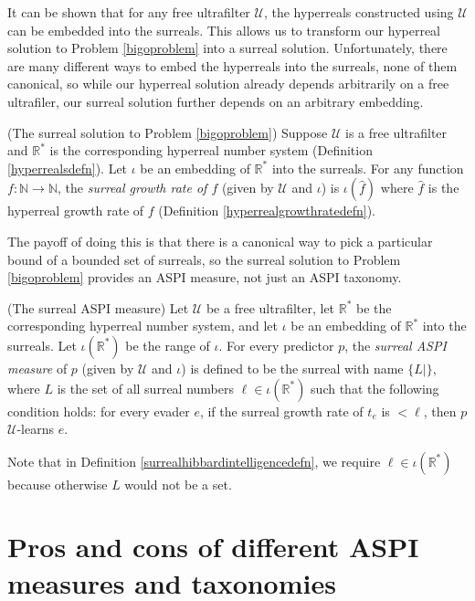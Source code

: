 \documentclass[twoside,11pt]{article}
\begin{document}
It can be shown that for any free ultrafilter $\mathcal U$, the hyperreals constructed using
$\mathcal U$ can be embedded into the surreals. This allows us to transform our hyperreal
solution to Problem \ref{bigoproblem} into a surreal solution.
Unfortunately, there are many different ways to embed the hyperreals into the surreals,
none of them canonical, so while our hyperreal solution already depends arbitrarily on
a free ultrafiler, our surreal solution further depends on an arbitrary embedding.

\begin{definition}
    (The surreal solution to Problem \ref{bigoproblem})
    Suppose $\mathcal U$ is a free ultrafilter and $\mathbb R^*$ is the corresponding
    hyperreal number system (Definition \ref{hyperrealsdefn}).
    Let $\iota$ be an embedding of $\mathbb R^*$ into the surreals.
    For any function $f:\mathbb N\to\mathbb N$, the \emph{surreal growth rate
    of $f$} (given by $\mathcal U$ and $\iota$) is
    $\iota(\hat f)$ where $\hat f$ is the hyperreal growth
    rate of $f$ (Definition \ref{hyperrealgrowthratedefn}).
\end{definition}

The payoff of doing this is that there is a canonical way to pick a particular
bound of a bounded set of surreals, so the surreal solution to Problem \ref{bigoproblem}
provides an ASPI measure, not just an ASPI taxonomy.

\begin{definition}
\label{surrealhibbardintelligencedefn}
    (The surreal ASPI measure)
    Let $\mathcal U$ be a free ultrafilter, let $\mathbb R^*$ be the corresponding
    hyperreal number system, and let $\iota$ be an embedding of $\mathbb R^*$
    into the surreals. Let $\iota(\mathbb R^*)$ be the range of $\iota$.
    For every predictor $p$, the \emph{surreal ASPI measure} of $p$
    (given by $\mathcal U$ and $\iota$)
    is defined to be the surreal with name $\{L|\}$,
    where $L$ is the set of all surreal numbers $\ell\in\iota(\mathbb R^*)$ such that
    the following condition holds: for every evader $e$,
    if the surreal growth rate of $t_e$ is $<\ell$, then $p$ $\mathcal U$-learns $e$.
\end{definition}

Note that in Definition \ref{surrealhibbardintelligencedefn}, we require
$\ell\in\iota(\mathbb R^*)$ because otherwise $L$ would not be a set.


\section{Pros and cons of different ASPI measures and taxonomies}
\label{prosandconssection}
\end{document}
